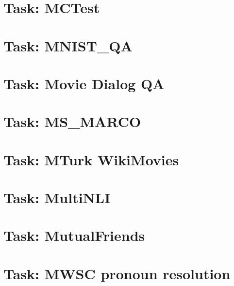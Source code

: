 \documentclass[twoside]{book}
\newcommand{\+}{\discretionary{\mbox{\scriptsize$\hookleftarrow$}}{}{}}
\begin{document}
\chapter{Task\+: M\+C\+Test}
\label{md_parlai_tasks_mctest_README}

\chapter{Task\+: M\+N\+I\+S\+T\+\_\+\+QA}
\label{md_parlai_tasks_mnist_qa_README}

\chapter{Task\+: Movie Dialog QA}
\label{md_parlai_tasks_moviedialog_README}

\chapter{Task\+: M\+S\+\_\+\+M\+A\+R\+CO}
\label{md_parlai_tasks_ms_marco_README}

\chapter{Task\+: M\+Turk Wiki\+Movies}
\label{md_parlai_tasks_mturkwikimovies_README}

\chapter{Task\+: Multi\+N\+LI}
\label{md_parlai_tasks_multinli_README}

\chapter{Task\+: Mutual\+Friends}
\label{md_parlai_tasks_mutualfriends_README}

\chapter{Task\+: M\+W\+SC pronoun resolution}
\label{md_parlai_tasks_mwsc_README}

\end{document}
